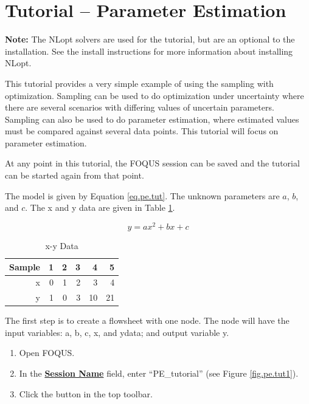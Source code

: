 \section{Tutorial -- Parameter Estimation}

\textbf{Note:} The NLopt solvers are used for the tutorial, but are an optional to the installation. See the install instructions for more information about installing NLopt.

This tutorial provides a very simple example of using the sampling with optimization. Sampling can be used to do optimization under uncertainty where there are several scenarios with differing values of uncertain parameters. Sampling can also be used to do parameter estimation, where estimated values must be compared against several data points. This tutorial will focus on parameter estimation.  

At any point in this tutorial, the FOQUS session can be saved and the tutorial can be started again from that point.

The model is given by Equation \ref{eq.pe.tut}.  The unknown parameters are $a$, $b$, and $c$. The x and y data are given in Table \ref{table.pe.data}.

\begin{equation}\label{eq.pe.tut}
y = ax^2 + bx + c
\end{equation}

\begin{table}[H]
	\begin{center}
		\caption{x-y Data}\label{table.pe.data}
		\begin{tabularx}{2.1in}{r r r r r r}
			\hline
			Sample  & 1 & 2 & 3 & 4 & 5 \\
			\hline
			x & 0 & 1 & 2 & 3  & 4 	 \\
			y & 1 & 0 & 3 & 10 & 21  \\
			\hline
		\end{tabularx}
	\end{center}
\end{table}

The first step is to create a flowsheet with one node.  The node will have the input variables: a, b, c, x, and ydata; and output variable y.
\begin{enumerate}
	\item Open FOQUS.
	\item In the \textbf{\underline{Session Name}} field, enter ``PE\_tutorial'' (see Figure \ref{fig.pe.tut1}).
	\item Click the  button in the top toolbar.
\end{enumerate}

